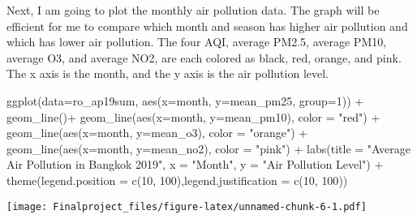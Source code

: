 \documentclass[
]{article}
\newenvironment{Shaded}{\begin{snugshade}}{\end{snugshade}}
\newcommand{\AttributeTok}[1]{\textcolor[rgb]{0.77,0.63,0.00}{#1}}
\newcommand{\DecValTok}[1]{\textcolor[rgb]{0.00,0.00,0.81}{#1}}
\newcommand{\FunctionTok}[1]{\textcolor[rgb]{0.00,0.00,0.00}{#1}}
\newcommand{\NormalTok}[1]{#1}
\newcommand{\SpecialCharTok}[1]{\textcolor[rgb]{0.00,0.00,0.00}{#1}}
\newcommand{\StringTok}[1]{\textcolor[rgb]{0.31,0.60,0.02}{#1}}
\begin{document}
Next, I am going to plot the monthly air pollution data. The graph will
be efficient for me to compare which month and season has higher air
pollution and which has lower air pollution. The four AQI, average
PM2.5, average PM10, average O3, and average NO2, are each colored as
black, red, orange, and pink. The x axis is the month, and the y axis is
the air pollution level.

\begin{Shaded}
\begin{Highlighting}[]
\FunctionTok{ggplot}\NormalTok{(}\AttributeTok{data=}\NormalTok{ro\_ap19sum, }\FunctionTok{aes}\NormalTok{(}\AttributeTok{x=}\NormalTok{month, }\AttributeTok{y=}\NormalTok{mean\_pm25, }\AttributeTok{group=}\DecValTok{1}\NormalTok{)) }\SpecialCharTok{+}
  \FunctionTok{geom\_line}\NormalTok{()}\SpecialCharTok{+}
  \FunctionTok{geom\_line}\NormalTok{(}\FunctionTok{aes}\NormalTok{(}\AttributeTok{x=}\NormalTok{month, }\AttributeTok{y=}\NormalTok{mean\_pm10), }\AttributeTok{color =} \StringTok{"red"}\NormalTok{) }\SpecialCharTok{+}
  \FunctionTok{geom\_line}\NormalTok{(}\FunctionTok{aes}\NormalTok{(}\AttributeTok{x=}\NormalTok{month, }\AttributeTok{y=}\NormalTok{mean\_o3), }\AttributeTok{color =} \StringTok{"orange"}\NormalTok{) }\SpecialCharTok{+}
  \FunctionTok{geom\_line}\NormalTok{(}\FunctionTok{aes}\NormalTok{(}\AttributeTok{x=}\NormalTok{month, }\AttributeTok{y=}\NormalTok{mean\_no2), }\AttributeTok{color =} \StringTok{"pink"}\NormalTok{) }\SpecialCharTok{+}
  \FunctionTok{labs}\NormalTok{(}\AttributeTok{title =} \StringTok{"Average Air Pollution in Bangkok 2019"}\NormalTok{, }\AttributeTok{x =} \StringTok{"Month"}\NormalTok{, }\AttributeTok{y =} \StringTok{"Air Pollution Level"}\NormalTok{) }\SpecialCharTok{+}
  \FunctionTok{theme}\NormalTok{(}\AttributeTok{legend.position =} \FunctionTok{c}\NormalTok{(}\DecValTok{10}\NormalTok{, }\DecValTok{100}\NormalTok{),}\AttributeTok{legend.justification =} \FunctionTok{c}\NormalTok{(}\DecValTok{10}\NormalTok{, }\DecValTok{100}\NormalTok{))}
\end{Highlighting}
\end{Shaded}

\texttt{[image: Finalproject\_files/figure-latex/unnamed-chunk-6-1.pdf]}
\end{document}

